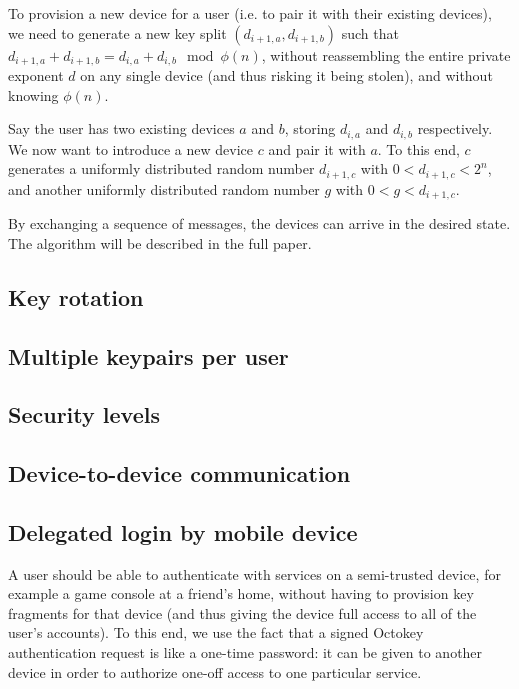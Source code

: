 To provision a new device for a user (i.e. to pair it with their existing devices), we need to
generate a new key split $(d_{i+1,a}, d_{i+1,b})$ such that
$d_{i+1,a} + d_{i+1,b} = d_{i,a} + d_{i,b} \mod \phi(n)$, without reassembling the entire private
exponent $d$ on any single device (and thus risking it being stolen), and without knowing $\phi(n)$.

Say the user has two existing devices $a$ and $b$, storing $d_{i,a}$ and $d_{i,b}$ respectively. We
now want to introduce a new device $c$ and pair it with $a$. To this end, $c$ generates a uniformly
distributed random number $d_{i+1,c}$ with $0 < d_{i+1,c} < 2^n$, and another uniformly distributed
random number $g$ with $0 < g < d_{i+1,c}$.

By exchanging a sequence of messages, the devices can arrive in the desired state. The algorithm
will be described in the full paper.

\subsection{Key rotation}
\subsection{Multiple keypairs per user}
\subsection{Security levels}
\subsection{Device-to-device communication}


\subsection{Delegated login by mobile device}\label{sec:delegation}

A user should be able to authenticate with services on a semi-trusted device, for example a game
console at a friend's home, without having to provision key fragments for that device (and thus
giving the device full access to all of the user's accounts). To this end, we use the fact that a
signed Octokey authentication request is like a one-time password: it can be given to another device
in order to authorize one-off access to one particular service.

